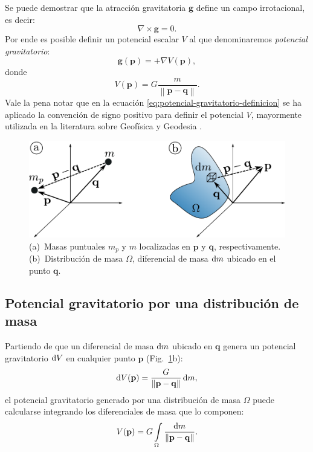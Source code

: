 Se puede demostrar que la atracción gravitatoria $\mathbf{g}$ define un campo
irrotacional, es decir:
%
\begin{equation}
    \nabla \times \mathbf{g} = 0.
\end{equation}
%
Por ende es posible definir un potencial escalar $V$ al que
denominaremos \emph{potencial gravitatorio}:
%
\begin{equation}
    \mathbf{g}(\mathbf{p}) = + \nabla V(\mathbf{p}),
    \label{eq:potencial-gravitatorio-definicion}
\end{equation}
%
donde
%
\begin{equation}
    V(\mathbf{p}) =
      G \frac{m}{\left\lVert \mathbf{p} - \mathbf{q} \right\rVert}.
    \label{eq:potencial-gravitatorio-particula}
\end{equation}
%
Vale la pena notar que en la ecuación
\ref{eq:potencial-gravitatorio-definicion} se ha aplicado la convención de
signo positivo para definir el potencial $V$, mayormente utilizada en la
literatura sobre Geofísica y Geodesia
\citep{heiskanen1967,blakely1995,hinze2009}.

\begin{figure}
    \centering
    \includegraphics[width=\linewidth]{figs/gravity-potentials.pdf}
    \caption{
        (a)~Masas puntuales $m_p$ y $m$ localizadas en $\mathbf{p}$
        y $\mathbf{q}$, respectivamente.
        (b)~Distribución de masa $\Omega$, diferencial de masa $\mathop{}\!\textnormal{d} m$
        ubicado en el punto $\mathbf{q}$.
    }
    \label{fig:potencial-gravitatorio}
\end{figure}


\subsection{Potencial gravitatorio por una distribución de masa}

Partiendo de que un diferencial de masa $\mathop{}\!\textnormal{d} m$ ubicado en $\mathbf{q}$
genera un potencial gravitatorio $\mathop{}\!\textnormal{d} V$ en cualquier punto $\mathbf{p}$
(Fig.~\ref{fig:potencial-gravitatorio}b):
%
\begin{equation}
    \mathop{}\!\textnormal{d} V(\mathbf{p}) = \frac{G}{\left\lVert \mathbf{p} - \mathbf{q}
        \right\rVert} \mathop{}\!\textnormal{d} m,
\end{equation}
%
el potencial gravitatorio generado por una distribución de masa
$\Omega$ puede calcularse integrando los diferenciales de masa que lo componen:
%
\begin{equation}
    V(\mathbf{p}) =
        G \int\limits_\Omega \frac{\mathop{}\!\textnormal{d} m}{\left\lVert \mathbf{p} - \mathbf{q}
            \right\rVert} .
\end{equation}

